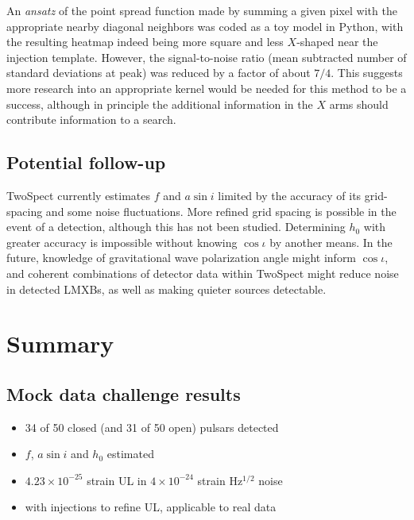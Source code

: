 An \textit{ansatz} of the point spread function made by summing a given pixel with the appropriate nearby diagonal neighbors was coded as a toy model in Python, with the resulting heatmap indeed being more square and less $X$-shaped near the injection template. However, the signal-to-noise ratio (mean subtracted number of standard deviations at peak) was reduced by a factor of about $7/4$. This suggests more research into an appropriate kernel would be needed for this method to be a success, although in principle the additional information in the $X$ arms should contribute information to a search. 

\subsection{Potential follow-up}

TwoSpect currently estimates $f$ and $a \sin i$ limited by the accuracy of its grid-spacing and some noise fluctuations. More refined grid spacing is possible in the event of a detection, although this has not been studied. Determining $h_0$ with greater accuracy is impossible without knowing $\cos \iota$ by another means. In the future, knowledge of gravitational wave polarization angle might inform $\cos \iota$, and coherent combinations of detector data within TwoSpect might reduce noise in detected LMXBs, as well as making quieter sources detectable. 

\section{Summary}

\subsection{Mock data challenge results}

\begin{itemize}
\item 34 of 50 closed (and 31 of 50 open) pulsars detected
\item $f$, $a \sin i$ and $h_0$ estimated
\item $4.23\times 10^{-25}$ strain UL in $4 \times 10^{-24}$ strain Hz$^{1/2}$ noise
\item with injections to refine UL, applicable to real data
\end{itemize}

